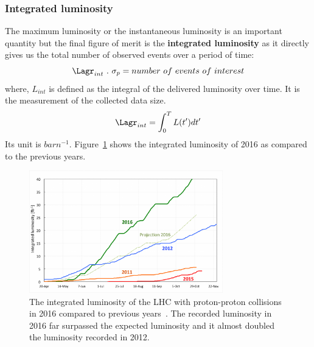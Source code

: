 \subsubsection{Integrated luminosity} %
\label{ssub:integrated_luminosity}
The maximum luminosity or the instantaneous luminosity is an important quantity but the final figure of merit is the \textbf{integrated luminosity} as it directly gives us the total number of observed events over a period of time:
\begin{equation}
	\Lagr_{int}~.~\sigma_p = number~of~events~of~interest
\end{equation}
where, $L_{int}$ is defined as the integral of the delivered luminosity over time. It is the measurement of the collected data size.
\begin{equation}
	\Lagr_{int} = \int_0^T L(t')dt'
\end{equation}
Its unit is $barn^{-1}$. Figure~\ref{fig:lumi-proj-2016-final-v2} shows the integrated luminosity of 2016 as compared to the previous years.
\begin{figure}[!htbp]
	\centering
	\includegraphics[width=0.75\textwidth]{figures/lumi-proj-2016-final-v2.png}
	\caption{The integrated luminosity of the LHC with proton-proton collisions in 2016 compared to previous years~\cite{Pralavorio2016}. The recorded luminosity in 2016 far surpassed the expected luminosity and it almost doubled the luminosity recorded in 2012.}
	\label{fig:lumi-proj-2016-final-v2}
\end{figure}





